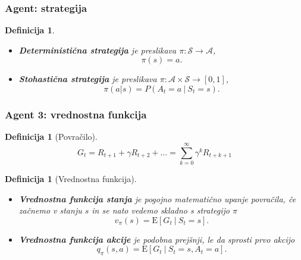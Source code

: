 \documentclass{beamer}    %
\newtheorem{definicija}[izrek]{Definicija}
\begin{document}
\begin{frame}
    \frametitle{Agent: strategija}
    \begin{definicija}
        \begin{itemize}
            \item \textbf{Deterministična strategija} je preslikava $\pi: \mathcal{S} \rightarrow \mathcal{A}$, 
                    $$
                    \pi(s) = a.
                    $$ 
            \item \textbf{Stohastična strategija} je preslikava $\pi: \mathcal{A} \times 
                    \mathcal{S} \rightarrow [0, 1]$, 
                    $$
                    \pi(a | s) = P(A_t = a~|~S_t = s).
                    $$
        \end{itemize}
    \end{definicija}
\end{frame}


\begin{frame}
    \frametitle{Agent 3: vrednostna funkcija}
    \begin{definicija}[Povračilo]
        $$
        G_t = R_{t+1} + \gamma R_{t+2} + ... = \sum_{k=0}^\infty \gamma^k R_{t + k + 1}
        $$
    \end{definicija}
    \pause
    \begin{definicija}[Vrednostna funkcija]
        \begin{itemize}
            \item \textbf{Vrednostna funkcija stanja} je pogojno matematično upanje povračila, če začnemo v 
                    stanju $s$ in se nato vedemo skladno s strategijo $\pi$ 
                    $$
                    v_\pi(s) = \mathrm{E} [G_t~|~S_t = s].
                    $$
            \pause 
            \item \textbf{Vrednostna funkcija akcije} je podobna prejšnji, le da sprosti prvo akcijo 
                    $$
                    q_\pi(s, a) = \mathrm{E} [G_t~|~S_t = s, A_t = a].
                    $$
        \end{itemize}
    \end{definicija}
\end{frame}
\end{document}
